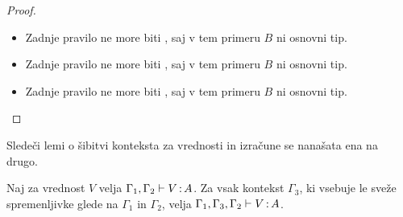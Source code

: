 \begin{proof}
\begin{itemize}
		\item Zadnje pravilo ne more biti , saj v tem primeru $B$ ni osnovni tip.
		
		\item Zadnje pravilo ne more biti , saj v tem primeru $B$ ni osnovni tip.
		
		\item Zadnje pravilo ne more biti , saj v tem primeru $B$ ni osnovni tip.
		
	\end{itemize}
\end{proof}

Sledeči lemi o šibitvi konteksta za vrednosti in izračune se nanašata ena na drugo.

\begin{lema}\label{lem:weakening-values}
	Naj za vrednost $V$ velja $\Gamma_1, \Gamma_2 \vdash V \mathinner{:} A$. Za vsak kontekst $\Gamma_3$, ki vsebuje le sveže spremenljivke glede na $\Gamma_1$ in $\Gamma_2$, velja $\Gamma_1, \Gamma_3, \Gamma_2 \vdash V \mathinner{:} A$.
\end{lema}

